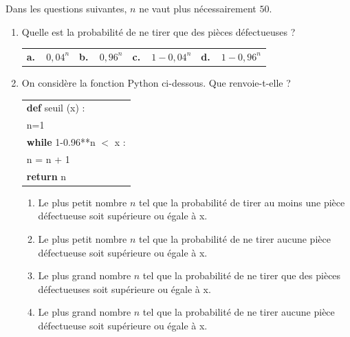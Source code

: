 \documentclass[10pt]{article}
\begin{document}
Dans les questions suivantes, $n$ ne vaut plus nécessairement $50$.

\begin{enumerate}[resume]
\item Quelle est la probabilité de ne tirer que des pièces défectueuses ?

\begin{center}
\begin{tabularx}{\linewidth}{*{4}X}
\textbf{a.~~}$0,04^n$&\textbf{b.~~}$0,96^n$&\textbf{c.~~}$1 - 0,04^n$ &\textbf{d.~~}$1 - 0,96^n$
\end{tabularx}
\end{center}

\item On considère la fonction Python ci-dessous. Que renvoie-t-elle ?

\begin{center}
\begin{tabularx}{0.4\linewidth}{|X|}\hline
\textbf{def} seuil (x) :\\
\qquad n=1\\
\qquad \textbf{while} 1-0.96**n $<$ x :\\
\qquad \quad  n = n + 1\\
\qquad \textbf{return} n\\ \hline
\end{tabularx}
\end{center}

	\begin{enumerate}
		\item Le plus petit nombre $n$ tel que la probabilité de tirer au moins une pièce défectueuse soit supérieure ou égale à x.
		\item Le plus petit nombre $n$ tel que la probabilité de ne tirer aucune pièce défectueuse soit supérieure ou égale à x.
		\item Le plus grand nombre $n$ tel que la probabilité de ne tirer que des pièces défectueuses soit supérieure ou égale à x.
		\item Le plus grand nombre $n$ tel que la probabilité de ne tirer aucune pièce défectueuse soit supérieure ou égale à x.
	\end{enumerate}
\end{enumerate}
\end{document}
